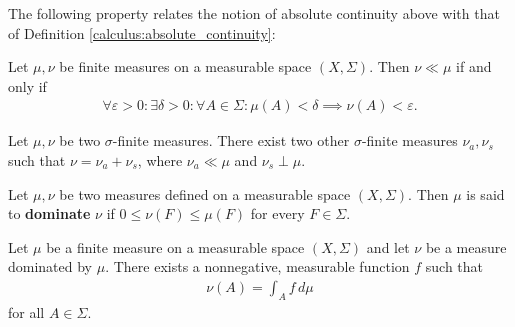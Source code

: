     The following property relates the notion of absolute continuity above with that of Definition \ref{calculus:absolute_continuity}:
    \begin{property}
        Let $\mu,\nu$ be finite measures on a measurable space $(X,\Sigma)$. Then $\nu\ll\mu$ if and only if
        \begin{gather}
            \forall\varepsilon>0:\exists\delta>0:\forall A\in\Sigma:\mu(A)<\delta\implies\nu(A)<\varepsilon.
        \end{gather}
    \end{property}

    \begin{theorem}
        Let $\mu,\nu$ be two $\sigma$-finite measures. There exist two other $\sigma$-finite measures $\nu_a,\nu_s$ such that $\nu=\nu_a+\nu_s$, where $\nu_a\ll\mu$ and $\nu_s\perp\mu$.
    \end{theorem}

    \begin{definition}
        Let $\mu,\nu$ be two measures defined on a measurable space $(X,\Sigma)$. Then $\mu$ is said to \textbf{dominate} $\nu$ if $0\leq\nu(F)\leq\mu(F)$ for every $F\in\Sigma$.
    \end{definition}

    \begin{theorem}
        Let $\mu$ be a finite measure on a measurable space $(X,\Sigma)$ and let $\nu$ be a measure dominated by $\mu$. There exists a nonnegative, measurable function $f$ such that
        \begin{gather}
            \nu(A) = \int_Af\,d\mu
        \end{gather}
        for all $A\in\Sigma$.
    \end{theorem}

